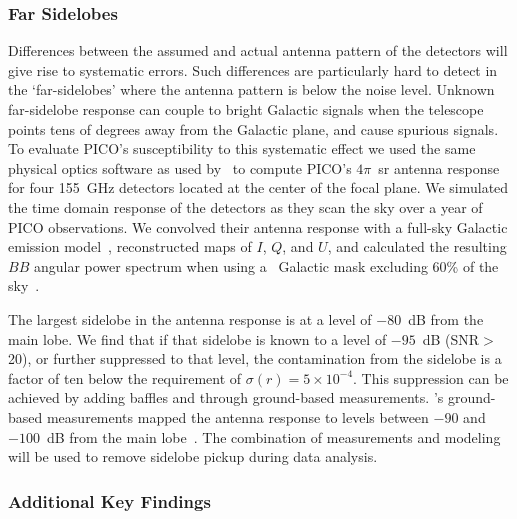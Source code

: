 \documentclass[PICOReport.tex]{subfiles}
\begin{document}
\subsubsection{Far Sidelobes}
\label{sec:fsl}

Differences between the assumed and actual antenna pattern of the detectors will give rise to systematic errors. Such differences are particularly hard to detect in the `far-sidelobes' where the antenna pattern is below the noise level. Unknown far-sidelobe response can couple to bright Galactic signals when the telescope points tens of degrees away from the Galactic plane, and cause spurious signals. To evaluate PICO's susceptibility to this systematic effect we used the same physical optics software as used by \planck\ to compute PICO's $4\pi$~sr antenna response for four 155~GHz detectors located at the center of the focal plane. We simulated the time domain response of the detectors as they scan the sky over a year of PICO observations. We convolved their antenna response with a full-sky Galactic emission model~\citep{thorne2018_pysm}, reconstructed maps of $I$, $Q$, and $U$, and calculated the resulting $BB$ angular power spectrum when using a \planck\ Galactic mask excluding 60\% of the sky~\citep{planck_2013_xv}. 

The largest sidelobe in the antenna response is at a level of $-80$~dB from the main lobe. We find that if that sidelobe is known to a level of $-95$~dB (\ac{SNR}$>$20), or further suppressed to that level, the contamination from the sidelobe is a factor of ten below the requirement of $\sigma(r) = 5 \times 10^{-4}$. This suppression can be achieved by adding baffles and through ground-based measurements. \planck 's ground-based measurements mapped the antenna response to levels between $-90$ and $-100$~dB from the main lobe~\citep{planck_sidelobes_IEEE}. The combination of measurements and modeling will be used to remove sidelobe pickup during data analysis. 
 

\subsubsection{Additional Key Findings}
\label{sec:systematics_key}
\end{document}
